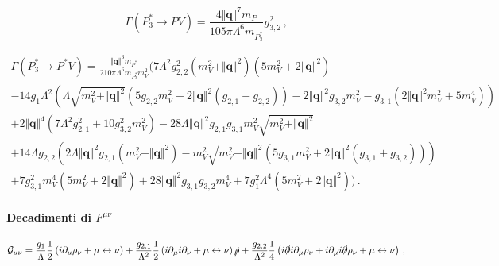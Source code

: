 \documentclass{article}
\begin{document}
\begin{equation}
  \Gamma\left( P^*_3 \to P V \right) = \frac{4 \Vert \mathbf{q} \Vert^7 m_P}{105 \pi \Lambda^6 m_{P_3^*}} g_{3,2}^2 \, ,
\end{equation}

\begin{multline}
  \Gamma\left( P^*_3 \to P^* V \right) = \frac{\Vert\mathbf{q}\Vert^3 m_{P^*}}{210 \pi  \Lambda ^6 m_{P_3^*} m_V^2} \Bigg(7 \Lambda ^2 g_{2,2}^2 \left(m_V^2+\Vert\mathbf{q}\Vert^2\right) \left(5 m_V^2+2 \Vert\mathbf{q}\Vert^2\right) \\
    -14 g_1 \Lambda ^2 \left(\Lambda  \sqrt{m_V^2+\Vert\mathbf{q}\Vert^2} \left(5 g_{2,2} m_V^2+2 \Vert\mathbf{q}\Vert^2 \left(g_{2,1}+g_{2,2}\right)\right)-2 \Vert\mathbf{q}\Vert^2 g_{3,2} m_V^2-g_{3,1} \left(2 \Vert\mathbf{q}\Vert^2 m_V^2+5 m_V^4\right)\right) \\
  +2 \Vert\mathbf{q}\Vert^4 \left(7 \Lambda ^2 g_{2,1}^2+10 g_{3,2}^2 m_V^2\right)-28 \Lambda  \Vert\mathbf{q}\Vert^2 g_{2,1} g_{3,1} m_V^2 \sqrt{m_V^2+\Vert\mathbf{q}\Vert^2} \\
  +14 \Lambda  g_{2,2} \left(2 \Lambda  \Vert\mathbf{q}\Vert^2 g_{2,1} \left(m_V^2+\Vert\mathbf{q}\Vert^2\right)-m_V^2 \sqrt{m_V^2+\Vert\mathbf{q}\Vert^2} \left(5 g_{3,1} m_V^2+2 \Vert\mathbf{q}\Vert^2 \left(g_{3,1}+g_{3,2}\right)\right)\right)\\ 
  +7 g_{3,1}^2 m_V^4 \left(5 m_V^2+2 \Vert\mathbf{q}\Vert^2\right)+28 \Vert\mathbf{q}\Vert^2 g_{3,1} g_{3,2} m_V^4+7 g_1^2 \Lambda ^4 \left(5 m_V^2+2 \Vert\mathbf{q}\Vert^2\right)\Bigg) \, .
\end{multline}

\paragraph{Decadimenti di $F^{\mu \nu}$}
\begin{equation}
  \mathcal{G}_{\mu \nu} = \frac{g_1}{\Lambda} \frac{1}{2} \left( i \partial_\mu \rho_\nu + \mu \leftrightarrow \nu \right) + \frac{g_{2,1}}{\Lambda^2} \frac{1}{2} \left( i \partial_\mu i \partial_\nu + \mu \leftrightarrow \nu \right) \slashed{\rho} + \frac{g_{2,2}}{\Lambda^2} \frac{1}{4} \left( i \slashed{\partial} i \partial_\mu \rho_\nu + i \partial_\mu i \slashed{\partial} \rho_\nu + \mu \leftrightarrow \nu \right) \, ,
\end{equation}
\end{document}
